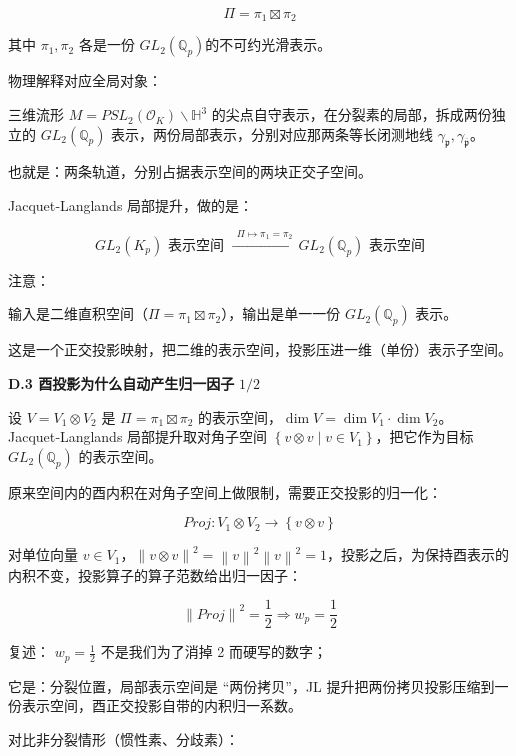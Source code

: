 \documentclass[11pt,a4paper]{ctexart}
\begin{document}
\[\Pi = \pi_{1} \boxtimes \pi_{2}\]

其中 \(\pi_{1},\pi_{2}\) 各是一份
\({GL}_{2}\left( \mathbb{Q}_{p} \right)\)的不可约光滑表示。

物理解释对应全局对象：

三维流形
\(M = {PSL}_{2}\left( \mathcal{O}_{K} \right)\backslash\mathbb{H}^{3}\)
的尖点自守表示，在分裂素的局部，拆成两份独立的
\({GL}_{2}\left( \mathbb{Q}_{p} \right)\)
表示，两份局部表示，分别对应那两条等长闭测地线
\(\gamma_{\mathfrak{p}},\gamma_{\overline{\mathfrak{p}}}\)。

也就是：两条轨道，分别占据表示空间的两块正交子空间。

Jacquet‑Langlands 局部提升，做的是：

\[{GL}_{2}\left( K_{p} \right)\text{~表示空间~}\overset{\ \ \Pi \mapsto \pi_{1} = \pi_{2}\ }{\rightarrow}{GL}_{2}\left( \mathbb{Q}_{p} \right)\text{~表示空间}\]

注意：

输入是二维直积空间（\(\Pi = \pi_{1} \boxtimes \pi_{2}\)），输出是单一一份
\({GL}_{2}\left( \mathbb{Q}_{p} \right)\) 表示。

这是一个正交投影映射，把二维的表示空间，投影压进一维（单份）表示子空间。

\textbf{D.3 酉投影为什么自动产生归一因子} \(1/2\)

设 \(V = V_{1} \otimes V_{2}\) 是 \(\Pi = \pi_{1} \boxtimes \pi_{2}\)
的表示空间，\(\dim V = {\dim V}_{1} \cdot {\dim V}_{2}\)。
Jacquet‑Langlands 局部提升取对角子空间
\(\left\{ v \otimes v \mid v \in V_{1} \right\}\)，把它作为目标
\({GL}_{2}\left( \mathbb{Q}_{p} \right)\) 的表示空间。

原来空间内的酉内积在对角子空间上做限制，需要正交投影的归一化：

\[Proj:V_{1} \otimes V_{2} \rightarrow \left\{ v \otimes v \right\}\]

对单位向量
\(v \in V_{1}\)，\(\left\| v \otimes v \right\|^{2} = \left\| v \right\|^{2}\left\| v \right\|^{2} = 1\)，投影之后，为保持酉表示的内积不变，投影算子的算子范数给出归一因子：

\[\left\| Proj \right\|^{2} = \frac{1}{2} \Longrightarrow w_{p} = \frac{1}{2}\]

复述： \(w_{p} = \frac{1}{2}\) 不是我们为了消掉 2 而硬写的数字；

它是：分裂位置，局部表示空间是 ``两份拷贝''，JL
提升把两份拷贝投影压缩到一份表示空间，酉正交投影自带的内积归一系数。

对比非分裂情形（惯性素、分歧素）：
\end{document}
